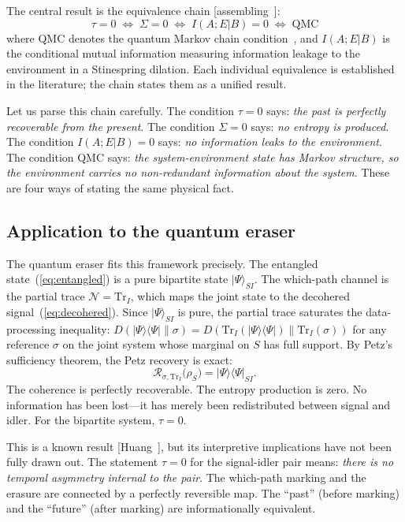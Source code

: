 \documentclass[12pt]{article}
\theoremstyle{definition}
\theoremstyle{remark}
\newcommand{\Tr}{\mathrm{Tr}}
\newcommand{\Petz}{\mathcal{R}}
\newcommand{\chan}{\mathcal{N}}
\newcommand{\ket}[1]{|#1\rangle}
\newcommand{\op}[2]{|#1\rangle\langle#2|}
\newcommand{\tauasym}{\tau}
\begin{document}
The central result is the equivalence chain
[assembling~\cite{Petz1988,Fawzi2015,Junge2018,Landi2021}]:
\begin{equation}
\boxed{
\tauasym = 0 \;\Longleftrightarrow\; \Sigma = 0
\;\Longleftrightarrow\; I(A;E|B) = 0
\;\Longleftrightarrow\; \text{QMC}
}
\label{eq:equiv_chain}
\end{equation}
where QMC denotes the quantum Markov chain
condition~\cite{Fawzi2015}, and $I(A;E|B)$ is the conditional
mutual information measuring information leakage to the environment
in a Stinespring dilation.  Each individual equivalence is
established in the literature; the chain states them as a unified
result.

Let us parse this chain carefully.  The condition $\tauasym = 0$
says: \emph{the past is perfectly recoverable from the present}.
The condition $\Sigma = 0$ says: \emph{no entropy is produced}.
The condition $I(A;E|B) = 0$ says: \emph{no information leaks to the
environment}.  The condition QMC says: \emph{the system-environment
state has Markov structure, so the environment carries no non-redundant
information about the system}.  These are four ways of stating the same
physical fact.

\subsection{Application to the quantum eraser}

The quantum eraser fits this framework precisely.  The entangled
state~(\ref{eq:entangled}) is a pure bipartite state
$\ket{\Psi}_{SI}$.  The which-path channel is the partial trace
$\chan = \Tr_I$, which maps the joint state to the decohered
signal~(\ref{eq:decohered}).  Since $\ket{\Psi}_{SI}$ is pure,
the partial trace saturates the data-processing inequality:
$D(\op{\Psi}{\Psi}\|\sigma) = D(\Tr_I(\op{\Psi}{\Psi})\|
\Tr_I(\sigma))$ for any reference $\sigma$ on the joint system
whose marginal on $S$ has full support.  By Petz's sufficiency
theorem, the Petz recovery is exact:
\begin{equation}
\Petz_{\sigma,\Tr_I}\big(\rho_S\big) = \op{\Psi}{\Psi}_{SI}.
\label{eq:eraser_recovery}
\end{equation}
The coherence is perfectly recoverable.  The entropy production
is zero.  No information has been lost---it has merely been
redistributed between signal and idler.  For the bipartite system,
$\tauasym = 0$.

This is a known result [Huang~\cite{Huang2026}], but its
interpretive implications have not been fully drawn out.
The statement $\tauasym = 0$ for the signal-idler pair means:
\emph{there is no temporal asymmetry internal to the pair}.
The which-path marking and the erasure are connected by a
perfectly reversible map.  The ``past'' (before marking) and
the ``future'' (after marking) are informationally equivalent.
\end{document}
